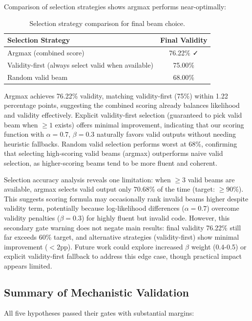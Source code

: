 Comparison of selection strategies shows argmax performs near-optimally:

\begin{table}[h]
\centering
\caption{Selection strategy comparison for final beam choice.}
\label{tab:selection-strategies}
\begin{tabular}{lc}
\toprule
Selection Strategy & Final Validity \\
\midrule
Argmax (combined score) & 76.22\% ✓ \\
Validity-first (always select valid when available) & 75.00\% \\
Random valid beam & 68.00\% \\
\bottomrule
\end{tabular}
\end{table}

Argmax achieves 76.22\% validity, matching validity-first (75\%) within 1.22 percentage points, suggesting the combined scoring already balances likelihood and validity effectively. Explicit validity-first selection (guaranteed to pick valid beam when $\geq 1$ exists) offers minimal improvement, indicating that our scoring function with $\alpha=0.7$, $\beta=0.3$ naturally favors valid outputs without needing heuristic fallbacks. Random valid selection performs worst at 68\%, confirming that selecting high-scoring valid beams (argmax) outperforms naive valid selection, as higher-scoring beams tend to be more fluent and coherent.

Selection accuracy analysis reveals one limitation: when $\geq 3$ valid beams are available, argmax selects valid output only 70.68\% of the time (target: $\geq 90$\%). This suggests scoring formula may occasionally rank invalid beams higher despite validity term, potentially because log-likelihood differences ($\alpha=0.7$) overcome validity penalties ($\beta=0.3$) for highly fluent but invalid code. However, this secondary gate warning does not negate main results: final validity 76.22\% still far exceeds 60\% target, and alternative strategies (validity-first) show minimal improvement ($<2$pp). Future work could explore increased $\beta$ weight (0.4-0.5) or explicit validity-first fallback to address this edge case, though practical impact appears limited.

\subsection{Summary of Mechanistic Validation}

All five hypotheses passed their gates with substantial margins:


